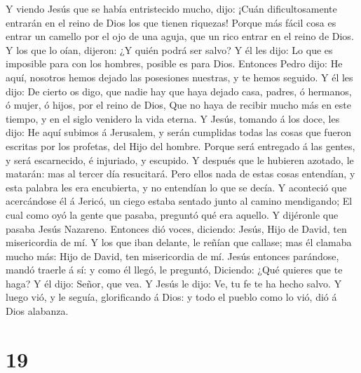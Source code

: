  Y viendo Jesús que se había entristecido mucho, dijo:
¡Cuán dificultosamente entrarán en el reino de Dios los que tienen
riquezas!  Porque más fácil cosa es entrar un camello por
el ojo de una aguja, que un rico entrar en el reino de Dios.
 Y los que lo oían, dijeron: ¿Y quién podrá ser salvo?
 Y él les dijo: Lo que es imposible para con los hombres,
posible es para Dios.  Entonces Pedro dijo: He aquí,
nosotros hemos dejado las posesiones nuestras, y te hemos seguido.
 Y él les dijo: De cierto os digo, que nadie hay que haya
dejado casa, padres, ó hermanos, ó mujer, ó hijos, por el reino de Dios,
 Que no haya de recibir mucho más en este tiempo, y en el
siglo venidero la vida eterna.  Y Jesús, tomando á los
doce, les dijo: He aquí subimos á Jerusalem, y serán cumplidas todas las
cosas que fueron escritas por los profetas, del Hijo del hombre.
 Porque será entregado á las gentes, y será escarnecido, é
injuriado, y escupido.  Y después que le hubieren azotado,
le matarán: mas al tercer día resucitará.  Pero ellos nada
de estas cosas entendían, y esta palabra les era encubierta, y no
entendían lo que se decía.  Y aconteció que acercándose él
á Jericó, un ciego estaba sentado junto al camino mendigando;
 El cual como oyó la gente que pasaba, preguntó qué era
aquello.  Y dijéronle que pasaba Jesús Nazareno.
 Entonces dió voces, diciendo: Jesús, Hijo de David, ten
misericordia de mí.  Y los que iban delante, le reñían que
callase; mas él clamaba mucho más: Hijo de David, ten misericordia de
mí.  Jesús entonces parándose, mandó traerle á sí: y como
él llegó, le preguntó,  Diciendo: ¿Qué quieres que te haga?
Y él dijo: Señor, que vea.  Y Jesús le dijo: Ve, tu fe te
ha hecho salvo.  Y luego vió, y le seguía, glorificando á
Dios: y todo el pueblo como lo vió, dió á Dios alabanza.

\hypertarget{section-18}{%
\section{19}\label{section-18}}

